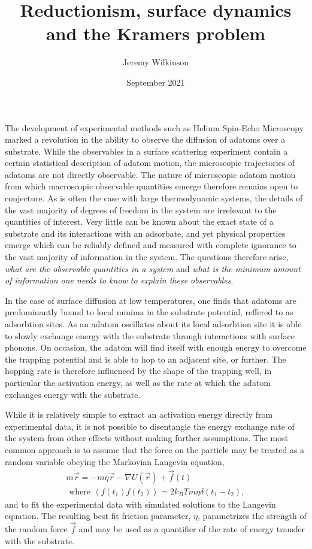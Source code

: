 \documentclass[7pt]{article}
\title{Reductionism, surface dynamics and the Kramers problem}
\author{Jeremy Wilkinson}
\date{September 2021}
\begin{document}
\maketitle

The development of experimental methods such as Helium Spin-Echo Microscopy marked a revolution in the ability to observe the diffusion of adatoms over a substrate\cite{FouquetHSEM, JardineHSEM}. While the observables in a surface scattering experiment contain a certain statistical description of adatom motion\cite{vanHowe}, the microscopic trajectories of adatoms are not directly observable. The nature of microscopic adatom motion from which macroscopic observable quantities emerge therefore remains open to conjecture. As is often the case with large thermodynamic systems, the details of the vast majority of degrees of freedom in the system are irrelevant to the quantities of interest. Very little can be known about the exact state of a substrate and its interactions with an adsorbate, and yet physical properties emerge which can be reliably defined and measured with complete ignorance to the vast majority of information in the system. The questions therefore arise, \emph{what are the observable quantities in a system} and \emph{what is the minimum amount of information one needs to know to explain these observables}. 

In the case of surface diffusion at low temperatures, one finds that adatoms are predominantly bound to local minima in the substrate potential, reffered to as adsorbtion sites. As an adatom oscillates about its local adsorbtion site it is able to slowly exchange energy with the substrate through interactions with surface phonons. On occasion, the adatom will find itself with enough energy to overcome the trapping potential and is able to hop to an adjacent site, or further. The hopping rate is therefore influenced by the shape of the trapping well, in particular the activation energy, as well as the rate at which the adatom exchanges energy with the substrate.

While it is relatively simple to extract an activation energy directly from experimental data\cite{someone}, it is not possible to disentangle the energy exchange rate of the system from other effects without making further assumptions. The most common approach is to assume that the force on the particle may be treated as a random variable obeying the Markovian Langevin equation,
\begin{equation}
\begin{gathered}
	m\ddot{\vec{r}}=-m\eta\dot{\vec{r}}-\nabla U(\vec{r})+\vec{f}(t) \\ 
	\text{ where } \left<f(t_1)f(t_2)\right>=2k_BTm\eta\delta(t_1-t_2),
\end{gathered}
	\label{eq:langevin}
\end{equation}
and to fit the experimental data with simulated solutions to the Langevin equation. The resulting best fit friction parameter, $\eta$, parametrizes the strength of the random force $\vec{f}$ and may be used as a quantifier of the rate of energy transfer with the substrate.
\end{document}
